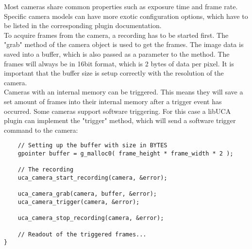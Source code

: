 Most cameras share common properties such as exposure time and frame rate. Specific camera models can have more exotic configuration options, which have to be listed in the corresponding plugin documentation.\\
To acquire frames from the camera, a recording has to be started first. The "grab" method of the camera object is used to get the frames. The image data is saved into a buffer, which is also passed as a parameter to the method. The frames will always be in 16bit format, which is 2 bytes of data per pixel. It is important that the buffer size is setup correctly with the resolution of the camera.\\
Cameras with an internal memory can be triggered. This means they will save a set amount of frames into their internal memory after a trigger event has occurred. Some cameras support software triggering. For this case a libUCA plugin can implement the "trigger" method, which will send a software trigger command to the camera:
\begin{lstlisting}
	// Setting up the buffer with size in BYTES
	gpointer buffer = g_malloc0( frame_height * frame_width * 2 );
	
	// The recording
	uca_camera_start_recording(camera, &error);

	uca_camera_grab(camera, buffer, &error);
	uca_camera_trigger(camera, &error);
			
	uca_camera_stop_recording(camera, &error);
	
	// Readout of the triggered frames...
}
\end{lstlisting}
